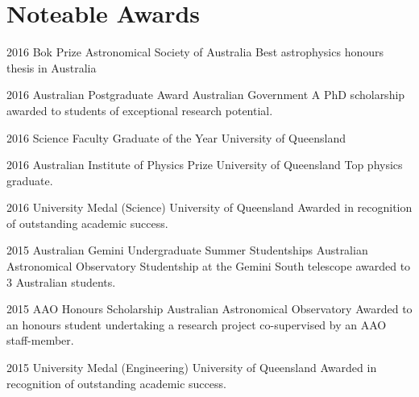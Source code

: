 \documentclass[]{friggeri-cv} %
\begin{document}
\section{Noteable Awards}

\begin{entrylist}
	\entryInline
	{2016} %
	{Bok Prize}
	{Astronomical Society of Australia}
	{Best astrophysics honours thesis in Australia}
\end{entrylist}
\begin{entrylist}
	\entryInlineSmall
	{2016} %
	{Australian Postgraduate Award}
	{Australian Government}
	{A PhD scholarship awarded to students of exceptional research potential.}
\end{entrylist}
\begin{entrylist}
	\entryInlineSmall
	{2016} %
	{Science Faculty Graduate of the Year}
	{University of Queensland}
	{}
\end{entrylist}
\begin{entrylist}
	\entryInline
	{2016} %
	{Australian Institute of Physics Prize}
	{University of Queensland}
	{Top physics graduate.}
\end{entrylist}
\begin{entrylist}
	\entryInlineSmall
	{2016} %
	{University Medal (Science)}
	{University of Queensland}
	{Awarded in recognition of outstanding academic success.}
\end{entrylist}
\begin{entrylist}
	\entryInlineSmall
	{2015} %
	{Australian Gemini Undergraduate Summer Studentships}
	{Australian Astronomical Observatory}
	{Studentship at the Gemini South telescope awarded to 3 Australian students.}
\end{entrylist}
\begin{entrylist}
	\entryInlineSmall
	{2015} %
	{AAO Honours Scholarship}
	{Australian Astronomical Observatory}
	{Awarded to an honours student undertaking a research project co-supervised by an AAO staff-member.}
\end{entrylist}
\begin{entrylist}
	\entryInlineSmall
	{2015} %
	{University Medal (Engineering)}
	{University of Queensland}
	{Awarded in recognition of outstanding academic success.}
\end{entrylist}
\end{document}
